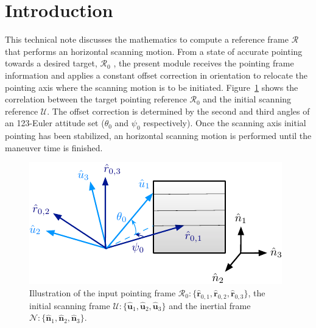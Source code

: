 \documentclass[]{AVSSimReportMemo}
\begin{document}
\section{Introduction}
This technical note discusses the mathematics to compute a reference frame $\mathcal{R}$ that performs an horizontal scanning motion. From a state of accurate pointing towards a desired target, $\mathcal{R}_0$ , the present module receives the pointing frame information and applies a constant offset correction in orientation to relocate the pointing axis where the scanning motion is to be initiated. Figure~\ref{fig:fig1} shows the correlation between the target pointing reference $\mathcal{R}_0$ and the initial scanning reference $\mathcal{U}$. The offset correction is determined by the second and third angles of an 123-Euler attitude set ($\theta_0$ and $\psi_0$ respectively). Once the scanning axis initial pointing has been stabilized, an horizontal scanning motion is performed until the maneuver time is finished.
\begin{figure}[htb]
	\centerline{
	\includegraphics{Figures/fig1}
	}
	\caption{Illustration of the input pointing frame $\mathcal{R}_{0}:\{ \hat {\bm r}_{0,1}, \hat {\bm r}_{0,2}, \hat {\bm r}_{0,3} \}$,
	the initial scanning frame $\mathcal{U}:\{ \hat {\bm u}_{1}, \hat {\bm u}_{2}, \hat {\bm u}_{3} \}$
	 and the inertial frame $\mathcal{N}:\{ \hat{\bm n}_{1}, \hat{\bm n}_{2}, \hat{\bm n}_{3} \}$.}
	\label{fig:fig1}
\end{figure}
\end{document}
